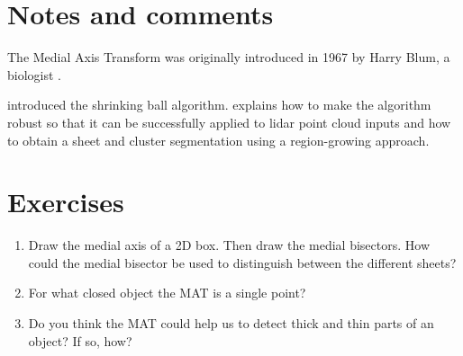 
\section{Notes and comments}
The Medial Axis Transform was originally introduced in 1967 by Harry Blum, a biologist \citep{Blum67}.

\citet{Ma12} introduced the shrinking ball algorithm. \citet{Peters18} explains how to make the algorithm robust so that it can be successfully applied to lidar point cloud inputs and how to obtain a sheet and cluster segmentation using a region-growing approach.


%
\section{Exercises}

\begin{enumerate}
  \item Draw the medial axis of a 2D box. Then draw the medial bisectors. How could the medial bisector be used to distinguish between the different sheets?
  \item For what closed object the MAT is a single point?
  \item Do you think the MAT could help us to detect thick and thin parts of an object? If so, how?
\end{enumerate}
